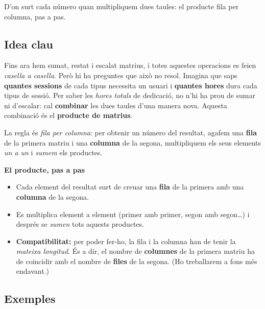 %
{D'on surt cada número quan multipliquem dues taules: el producte fila per columna, pas a pas.}

\subsection{Idea clau}

Fins ara hem sumat, restat i escalat matrius, i totes aquestes operacions es
feien \emph{casella a casella}. Però hi ha preguntes que això no resol. Imagina
que saps \textbf{quantes sessions} de cada tipus necessita un usuari i
\textbf{quantes hores} dura cada tipus de sessió. Per saber les \emph{hores
totals} de dedicació, no n'hi ha prou de sumar ni d'escalar: cal \textbf{combinar}
les dues taules d'una manera nova. Aquesta combinació és el \textbf{producte de
matrius}.

La regla és \emph{fila per columna}: per obtenir un número del resultat, agafem
una \textbf{fila} de la primera matriu i una \textbf{columna} de la segona,
multipliquem els seus elements \emph{un a un} i \emph{sumem} els productes.

\begin{idea}
\textbf{El producte, pas a pas}
\begin{itemize}[leftmargin=1.4em, itemsep=2pt]
  \item Cada element del resultat surt de creuar una \textbf{fila} de la primera
        amb una \textbf{columna} de la segona.
  \item Es multiplica element a element (primer amb primer, segon amb segon\dots)
        i després se \emph{sumen} tots aquests productes.
  \item \textbf{Compatibilitat:} per poder fer-ho, la fila i la columna han de
        tenir la \emph{mateixa longitud}. És a dir, el nombre de \textbf{columnes}
        de la primera matriu ha de coincidir amb el nombre de \textbf{files} de la
        segona. (Ho treballarem a fons més endavant.)
\end{itemize}
\end{idea}

\subsection{Exemples}

